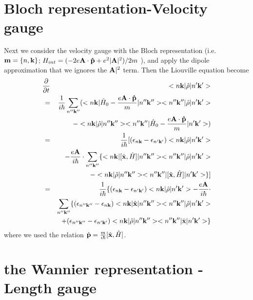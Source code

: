\documentclass[aps,prb,reprint]{revtex4-1}
\begin{document}
\section{Bloch representation-Velocity gauge}
Next we consider the velocity gauge with the Bloch representation (i.e. ${\bf m} = \{n, {\bf k}\}$; $H_{int} =( - 2e{\bf A} \cdot {\bf \hat{p}} + e^2 |{\bf A}|^2)/2m$ ), and apply the dipole approximation that we ignores the ${\bf A}|^2$ term. Then the Liouville equation become 
\begin{eqnarray*}
\frac{ \partial }{\partial t } &&<n{\bf k}| \hat{\rho} |n'{\bf k'}> \\
= && \frac{1}{i \hbar}  \sum_{n''{\bf k''}} ( <n{\bf k}| \hat{H}_0 - \frac{e{\bf A} \cdot {\bf \hat{p}} }{m} |n''{\bf k''}><n''{\bf k''}| \hat{\rho} |n'{\bf k'}> \\
&&- <n{\bf k}| \hat{\rho} |n''{\bf k''}><n''{\bf k''}| \hat{H}_0 - \frac{e{\bf A} \cdot {\bf \hat{p}} }{m}  |n'{\bf k'}> )\\
= &&\frac{1}{i \hbar} [ (\epsilon_{n{\bf k}}-\epsilon_{n'{\bf k'}}) <n{\bf k}| \hat{\rho} |n'{\bf k'}> \\
&& -\frac{e{\bf A}}{i \hbar} \cdot \sum_{n''{\bf k''}} \{ <n{\bf k}|[ \hat{\bf x},\hat{H}] |n''{\bf k''}> <n''{\bf k''}| \hat{\rho} |n'{\bf k'}>\\ 
&& - <n{\bf k}| \hat{\rho} |n''{\bf k''}><n''{\bf k''}|[ \hat{\bf x},\hat{H}] |n'{\bf k'}> \} ] \\
= &&\frac{1}{i \hbar} \{ (\epsilon_{n{\bf k}}-\epsilon_{n'{\bf k'}}) <n{\bf k}| \hat{\rho} |n'{\bf k'}> -\frac{e{\bf A}}{i \hbar} \cdot  \\
&& \sum_{n''{\bf k''}} \{ (\epsilon_{n''{\bf k''}}-\epsilon_{n{\bf k}})  <n{\bf k}| \hat{\bf x} |n''{\bf k''}> <n''{\bf k''}| \hat{\rho} |n'{\bf k'}>\\ 
&&+ (\epsilon_{n''{\bf k''}}-\epsilon_{n'{\bf k'}}) <n{\bf k}| \hat{\rho} |n''{\bf k''}><n''{\bf k''}| \hat{\bf x} |n'{\bf k'}> \} \\ 
\end{eqnarray*}
where we used the relation $\hat{\bf p} = \frac{m}{i \hbar}[\hat{\bf x},\hat{H}]$.
\section{the Wannier representation -Length gauge }
\end{document}
